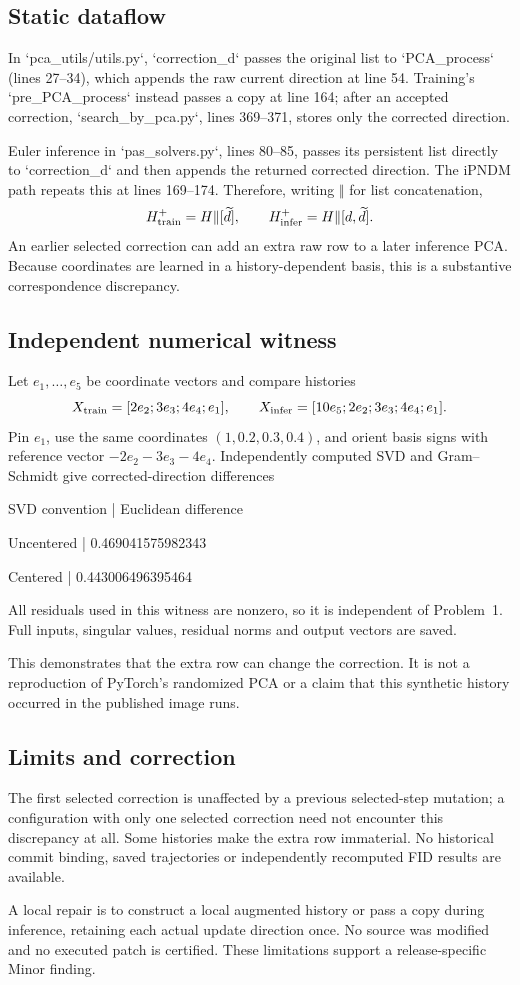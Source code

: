 \documentclass[10pt]{article}
\begin{document}
\subsection*{Static dataflow}
In `pca\_utils/utils.py`, `correction\_d` passes the original list to `PCA\_process` (lines 27–34), which appends the raw current direction at line 54. Training’s `pre\_PCA\_process` instead passes a copy at line 164; after an accepted correction, `search\_by\_pca.py`, lines 369–371, stores only the corrected direction.\par
Euler inference in `pas\_solvers.py`, lines 80–85, passes its persistent list directly to `correction\_d` and then appends the returned corrected direction. The iPNDM path repeats this at lines 169–174. Therefore, writing \(\Vert\) for list concatenation, \[H_{\rm train}^{+}=H\Vert[\widetilde d],
 \qquad H_{\rm infer}^{+}=H\Vert[d,\widetilde d].\] An earlier selected correction can add an extra raw row to a later inference PCA. Because coordinates are learned in a history-dependent basis, this is a substantive correspondence discrepancy.\par
\subsection*{Independent numerical witness}
Let \(e_1,\ldots,e_5\) be coordinate vectors and compare histories \[X_{\rm train}=[2e_2;3e_3;4e_4;e_1],\qquad
 X_{\rm infer}=[10e_5;2e_2;3e_3;4e_4;e_1].\] Pin \(e_1\), use the same coordinates \((1,0.2,0.3,0.4)\), and orient basis signs with reference vector \(-2e_2-3e_3-4e_4\). Independently computed SVD and Gram–Schmidt give corrected-direction differences\par
SVD convention | Euclidean difference\par
Uncentered | 0.469041575982343\par
Centered | 0.443006496395464\par
All residuals used in this witness are nonzero, so it is independent of Problem 1. Full inputs, singular values, residual norms and output vectors are saved.\par
This demonstrates that the extra row can change the correction. It is not a reproduction of PyTorch’s randomized PCA or a claim that this synthetic history occurred in the published image runs.\par
\subsection*{Limits and correction}
The first selected correction is unaffected by a previous selected-step mutation; a configuration with only one selected correction need not encounter this discrepancy at all. Some histories make the extra row immaterial. No historical commit binding, saved trajectories or independently recomputed FID results are available.\par
A local repair is to construct a local augmented history or pass a copy during inference, retaining each actual update direction once. No source was modified and no executed patch is certified. These limitations support a release-specific Minor finding.\par
\end{document}
